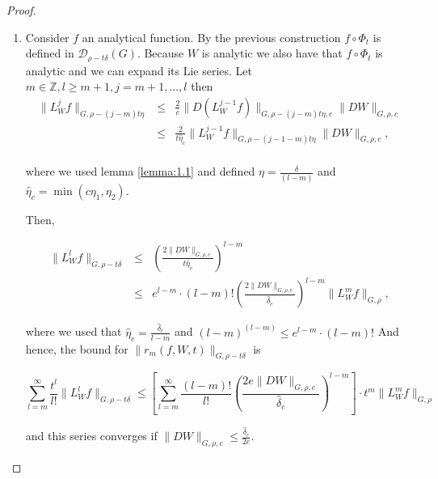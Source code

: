 \begin{proof}
\begin{enumerate}
\item
Consider $f$ an analytical function.
By the previous construction $f\circ\Phi_t$ is defined in $\mathcal{D}_{\rho -t\delta}(G)$.
Because $W$ is analytic we also have that $f\circ\Phi_t$ is analytic and we can expand its Lie series.
Let $m \in \mathbb{Z}, l \geq m+1, j = m+1,\ldots,l$ then
$$
\begin{array}{rcl}
\|L_W^jf\|_{G,\rho-(j-m)t\eta} & \leq & \frac{2}{c}\|D(L_W^{j-1} f)\|_{G,\rho-(j-m)t\eta,c}\|DW\|_{G,\rho,c}\\
 & \leq & \frac{2}{t\hat\eta_c}\|L_W^{j-1} f\|_{G,\rho-(j-1-m)t\eta}\|D W\|_{G,\rho,c},\\
\end{array}
$$

where we used lemma \ref{lemma:1.1} and defined $\eta = \frac{\delta}{(l-m)}$ and $\hat\eta_c = \min(c\eta_1,\eta_2)$.

Then,

$$\begin{array}{rcl}
\|L_W^l f\|_{G,\rho-t\delta} & \leq & \left(\frac{2\|DW\|_{G,\rho,c}}{t\hat\eta_c}\right)^{l-m}\\
&\leq& e^{l-m}\cdot(l-m)!\left(\frac{2\|DW\|_{G,\rho,c}}{\hat\delta_c}\right)^{l-m}\|L_W^m f\|_{G,\rho},
\end{array}$$

where we used that $\hat\eta_c = \frac{\hat\delta_c}{l-m}$ and $(l-m)^{(l-m)}\leq e^{l-m}\cdot(l-m)!$
And hence, the bound for $\|r_m(f,W,t)\|_{G,\rho-t\delta}$ is

$$\sum_{l=m}^\infty \frac{t^l}{l!}\|L_W^l f\|_{G,\rho-t\delta} \leq \left[\sum_{l= m}^\infty \frac{(l-m)!}{l!}\left(\frac{2e \|DW\|_{G,\rho,c}}{\hat\delta_c}\right)^{l-m}\right]\cdot t^m \|L_W^m f\|_{G,\rho}$$

and this series converges if $\|DW\|_{G,\rho,c} \leq \frac{\hat\delta_c}{2e}$.

\end{enumerate}
\end{proof}

